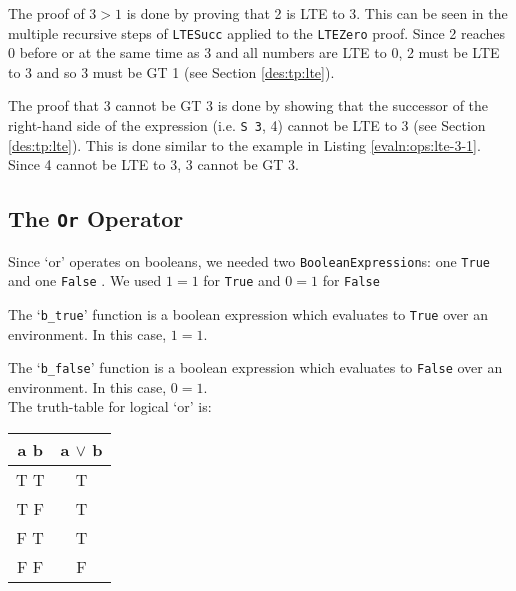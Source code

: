         
        The proof of $3 > 1$ is done by proving that 2 is LTE to 3. This can be seen in the multiple recursive steps of \texttt{LTESucc} applied to the \texttt{LTEZero} proof. Since 2 reaches 0 before or at the same time as 3 and all numbers are LTE to 0, 2 must be LTE to 3 and so 3 must be GT 1 (see Section \ref{des:tp:lte}).
        
        \newpage
        
        
        The proof that 3 cannot be GT 3 is done by showing that the successor of the right-hand side of the expression (i.e. \texttt{S 3}, 4) cannot be LTE to 3 (see Section \ref{des:tp:lte}). This is done similar to the example in Listing \ref{evaln:ops:lte-3-1}. Since 4 cannot be LTE to 3, 3 cannot be GT 3.
    
    \subsection{The \texttt{Or} Operator}\label{evaln:ops:or}
        Since `or' operates on booleans, we needed two \texttt{BooleanExpression}s: one \texttt{True} and one \texttt{False} . We used $1 = 1$ for \texttt{True} and $0 = 1$ for \texttt{False}
        
        
        The `\texttt{b\_true}' function is a boolean expression which evaluates to \texttt{True} over an environment. In this case, $1 = 1$.
        
        
        The `\texttt{b\_false}' function is a boolean expression which evaluates to \texttt{False} over an environment. In this case, $0 = 1$.
        \\
    
        The truth-table for logical `or' is:
        \begin{center}
            \begin{tabular}{c | c}
                a b & a $\lor$ b \\
                \hline
                T T & T \\
                T F & T \\
                F T & T \\
                F F & F \\
            \end{tabular}
        \end{center}
    
